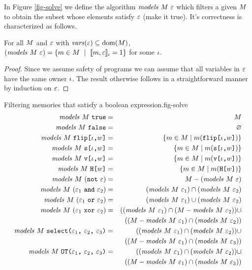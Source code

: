 In Figure \ref{fig-solve} we define the algorithm
$\mathit{models}\ M\ \varepsilon$ which filters a given $M$ to obtain the
subset whose elements satisfy $\varepsilon$ (make it true). It's correctness
is characterized as follows.
\begin{lemma}
  \label{lemma-solves}
  For all $M$ and $\varepsilon$ with $\mathit{vars}(\varepsilon) \subseteq \mathrm{dom}(M)$,
  $(\solve{\stores}{\be}) = \{ \store \in \stores \ \mid\ \lcod{\store,\be}{\cid} = 1 \}$
  for some $\iota$.
\end{lemma}
\begin{proof}
  Since we assume safety of programs we can assume that all variables in $\varepsilon$ have the
  same owner $\iota$. The result otherwise follows in a straightforward manner by induction
  on $\varepsilon$. 
\end{proof}

\begin{fpfig}[t]{Filtering memories that satisfy a boolean expression.}{fig-solve}
{\small
\begin{eqnarray*}
\mathit{models}\ M\ \texttt{true} &=& M\\
\mathit{models}\ M\ \texttt{false} &=& \varnothing\\
\mathit{models}\ M\ \texttt{flip[}\iota\texttt{,}w\texttt{]} &=& \{ m \in M \mid m(\texttt{flip[}\iota\texttt{,}w\texttt{]}) \} \\
\mathit{models}\ M\ \texttt{s[}\iota\texttt{,}w\texttt{]} &=& \{ m \in M \mid m(\texttt{s[}\iota\texttt{,}w\texttt{]}) \} \\
\mathit{models}\ M\ \texttt{v[}\iota\texttt{,}w\texttt{]} &=& \{ m \in M \mid m(\texttt{v[}\iota\texttt{,}w\texttt{]}) \} \\
\mathit{models}\ M\ \texttt{H[}w\texttt{]} &=& \{ m \in M \mid m(\texttt{H[}w\texttt{]}) \} \\
\mathit{models}\ M\ (\texttt{not}\ \varepsilon) &=& M - (\mathit{models}\ M\ \varepsilon)\\
\mathit{models}\ M\ (\varepsilon_1\ \texttt{and}\ \varepsilon_2) &=& (\mathit{models}\ M\ \varepsilon_1) \cap (\mathit{models}\ M\ \varepsilon_2) \\
\mathit{models}\ M\ (\varepsilon_1\ \texttt{or}\ \varepsilon_2) &=& (\mathit{models}\ M\ \varepsilon_1) \cup (\mathit{models}\ M\ \varepsilon_2) \\
\mathit{models}\ M\ (\varepsilon_1\ \texttt{xor}\ \varepsilon_2) &=&
 ((\mathit{models}\ M\ \varepsilon_1) \cap (M - \mathit{models}\ M\ \varepsilon_2)) \cup\\
 && ((M - \mathit{models}\ M\ \varepsilon_1) \cap (\mathit{models}\ M\ \varepsilon_2)) \\
\mathit{models}\ M\ \texttt{select(} \varepsilon_1 \texttt{,}\ \varepsilon_2 \texttt{,}\ \varepsilon_3 \texttt{)} &=&
 ((\mathit{models}\ M\ \varepsilon_1) \cap (\mathit{models}\ M\ \varepsilon_2)) \cup \\
 && ((M - \mathit{models}\ M\ \varepsilon_1) \cap (\mathit{models}\ M\ \varepsilon_3)) \\
\mathit{models}\ M\ \texttt{OT(} \varepsilon_1 \texttt{,}\ \varepsilon_2 \texttt{,}\ \varepsilon_3 \texttt{)} &=&
 ((\mathit{models}\ M\ \varepsilon_1) \cap (\mathit{models}\ M\ \varepsilon_2)) \cup\\
 && ((M - \mathit{models}\ M\ \varepsilon_1) \cap (\mathit{models}\ M\ \varepsilon_3))
\end{eqnarray*}
}
\end{fpfig}

